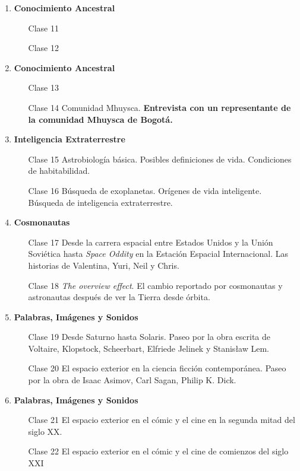 \documentclass{report}
\begin{document}
\begin{enumerate}
\item {\bf Conocimiento Ancestral}
\begin{itemize}
\item[Clase 11]
\item[Clase 12]
\end{itemize}

\item {\bf Conocimiento Ancestral}
\begin{itemize}
\item[Clase 13]
\item[Clase 14] Comunidad Mhuysca. {\bf Entrevista con un representante de la
  comunidad Mhuysca de Bogot\'a.}
\end{itemize}

\item {\bf Inteligencia Extraterrestre}
\begin{itemize}
\item[Clase 15] Astrobiolog\'ia b\'asica. Posibles definiciones de
  vida. Condiciones de habitabilidad.
\item[Clase 16] B\'usqueda de exoplanetas. Or\'igenes de vida
  inteligente.  B\'usqueda de inteligencia extraterrestre.
\end{itemize}

\item {\bf Cosmonautas}
\begin{itemize}
\item[Clase 17] Desde la carrera espacial entre Estados Unidos y la Uni\'on
  Sovi\'etica hasta \emph{Space Oddity} en la Estaci\'on Espacial
  Internacional. Las historias de Valentina, Yuri, Neil y Chris.
\item[Clase 18] \emph{The overview effect}. El cambio reportado por
  cosmonautas y astronautas despu\'es de ver la Tierra desde \'orbita.
\end{itemize}

\item {\bf Palabras, Im\'agenes y Sonidos}
\begin{itemize}
\item[Clase 19] Desde Saturno hasta Solaris. Paseo por la obra escrita
  de Voltaire, Klopstock, Scheerbart, Elfriede Jelinek y Stanis\l aw Lem.
\item[Clase 20] El espacio exterior en la ciencia ficci\'on
  contempor\'anea. Paseo por la obra de Isaac Asimov, Carl Sagan, Philip K. Dick.
\end{itemize}

\item {\bf Palabras, Im\'agenes y Sonidos}
\begin{itemize}
\item[Clase 21] El espacio exterior en el c\'omic y el cine en la
  segunda mitad del siglo XX. 
\item[Clase 22] El espacio exterior en el c\'omic y el cine de
  comienzos del siglo XXI
\end{itemize}


\end{enumerate}
\end{document}
